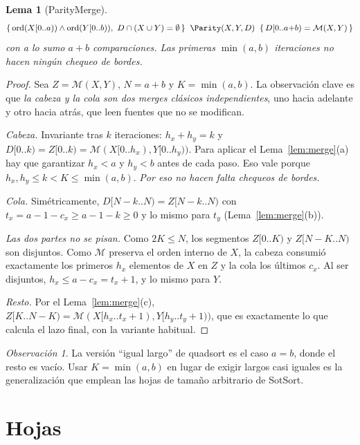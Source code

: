 \documentclass[10pt,a4paper]{article}
\theoremstyle{plain}
\newtheorem{lema}[teorema]{Lema}
\theoremstyle{definition}
\theoremstyle{remark}
\newtheorem{observacion}[teorema]{Observación}
\newcommand{\Mrg}{\mathcal{M}}
\newcommand{\hoare}[3]{\{\,#1\,\}\;\;#2\;\;\{\,#3\,\}}
\newcommand{\sortd}{\operatorname{ord}}
\begin{document}
\begin{lema}[ParityMerge]\label{lem:parity}
\[
\hoare{\sortd(X[0..a))\wedge\sortd(Y[0..b)),\ D\cap(X\cup Y)=\emptyset}{\Parity(X,Y,D)}{D[0..a{+}b)=\Mrg(X,Y)}
\]
con a lo sumo $a+b$ comparaciones. Las primeras $\min(a,b)$ iteraciones no hacen
ningún chequeo de bordes.
\end{lema}
\begin{proof}
Sea $Z=\Mrg(X,Y)$, $N=a+b$ y $K=\min(a,b)$. La observación clave es que \emph{la
cabeza y la cola son dos merges clásicos independientes}, uno hacia adelante y otro
hacia atrás, que leen fuentes que no se modifican.

\emph{Cabeza.} Invariante tras $k$ iteraciones: $h_x+h_y=k$ y
$D[0..k)=Z[0..k)=\Mrg(X[0..h_x),Y[0..h_y))$. Para aplicar el
Lema~\ref{lem:merge}(a) hay que garantizar $h_x<a$ y $h_y<b$ antes de cada paso. Eso
vale porque $h_x,h_y\le k<K\le\min(a,b)$. \emph{Por eso no hacen falta chequeos de
bordes.}

\emph{Cola.} Simétricamente, $D[N{-}k..N)=Z[N{-}k..N)$ con $t_x=a-1-c_x\ge a-1-k\ge 0$
y lo mismo para $t_y$ (Lema~\ref{lem:merge}(b)).

\emph{Las dos partes no se pisan.} Como $2K\le N$, los segmentos $Z[0..K)$ y
$Z[N{-}K..N)$ son disjuntos. Como $\Mrg$ preserva el orden interno de $X$, la cabeza
consumió exactamente los primeros $h_x$ elementos de $X$ en $Z$ y la cola los últimos
$c_x$. Al ser disjuntos, $h_x\le a-c_x=t_x+1$, y lo mismo para $Y$.

\emph{Resto.} Por el Lema~\ref{lem:merge}(c),
$Z[K..N{-}K)=\Mrg(X[h_x..t_x{+}1),Y[h_y..t_y{+}1))$, que es exactamente lo que
calcula el lazo final, con la variante habitual.
\end{proof}

\begin{observacion}
La versión ``igual largo'' de quadsort es el caso $a=b$, donde el resto es vacío.
Usar $K=\min(a,b)$ en lugar de exigir largos casi iguales es la generalización que
emplean las hojas de tamaño arbitrario de SotSort.
\end{observacion}

\section{Hojas}
\end{document}
